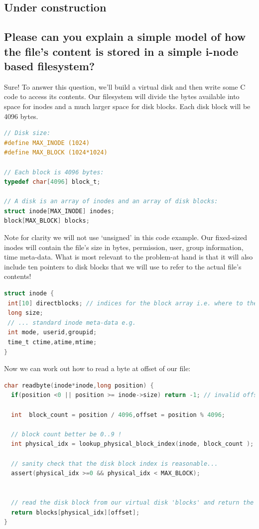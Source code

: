 \subsection{Under construction}\label{under-construction}

\subsection{Please can you explain a simple model of how the file's content is stored in a simple i-node based filesystem?}

Sure! To answer this question, we'll build a virtual disk and then write some C code to access its contents. Our filesystem will divide the bytes available into space for inodes and a much larger space for disk blocks. Each disk block will be 4096 bytes.

\begin{lstlisting}[language=C]
// Disk size:
#define MAX_INODE (1024)
#define MAX_BLOCK (1024*1024)

// Each block is 4096 bytes:
typedef char[4096] block_t;

// A disk is an array of inodes and an array of disk blocks:
struct inode[MAX_INODE] inodes;
block[MAX_BLOCK] blocks;
\end{lstlisting}

Note for clarity we will not use `unsigned' in this code example. Our fixed-sized inodes will contain the file's size in bytes, permission, user, group information, time meta-data. What is most relevant to the problem-at hand is that it will also include ten pointers to disk blocks that we will use to refer to the actual file's contents!

\begin{lstlisting}[language=C]
struct inode {
 int[10] directblocks; // indices for the block array i.e. where to the find the file's content
 long size;
 // ... standard inode meta-data e.g.
 int mode, userid,groupid;
 time_t ctime,atime,mtime;
}
\end{lstlisting}

Now we can work out how to read a byte at offset  of our file:

\begin{lstlisting}[language=C]
char readbyte(inode*inode,long position) {
  if(position <0 || position >= inode->size) return -1; // invalid offset

  int  block_count = position / 4096,offset = position % 4096;
  
  // block count better be 0..9 !
  int physical_idx = lookup_physical_block_index(inode, block_count );

  // sanity check that the disk block index is reasonable...
  assert(physical_idx >=0 && physical_idx < MAX_BLOCK);


  // read the disk block from our virtual disk 'blocks' and return the specific byte
  return blocks[physical_idx][offset];
}
\end{lstlisting}

